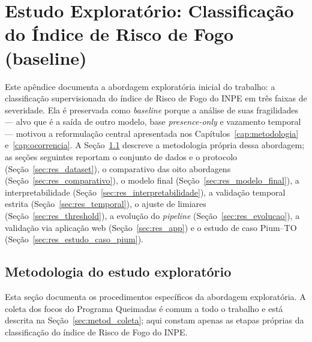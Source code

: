\chapter{Estudo Exploratório: Classificação do Índice de Risco de Fogo (baseline)}
\label{cap:resultados}

Este apêndice documenta a abordagem exploratória inicial do trabalho: a classificação supervisionada do índice de Risco de Fogo do INPE em três faixas de severidade. Ela é preservada como \emph{baseline} porque a análise de suas fragilidades --- alvo que é a saída de outro modelo, base \emph{presence-only} e vazamento temporal --- motivou a reformulação central apresentada nos Capítulos~\ref{cap:metodologia} e~\ref{cap:ocorrencia}. A Seção~\ref{sec:ap_metodologia} descreve a metodologia própria dessa abordagem; as seções seguintes reportam o conjunto de dados e o protocolo (Seção~\ref{sec:res_dataset}), o comparativo das oito abordagens (Seção~\ref{sec:res_comparativo}), o modelo final (Seção~\ref{sec:res_modelo_final}), a interpretabilidade (Seção~\ref{sec:res_interpretabilidade}), a validação temporal estrita (Seção~\ref{sec:res_temporal}), o ajuste de limiares (Seção~\ref{sec:res_threshold}), a evolução do \emph{pipeline} (Seção~\ref{sec:res_evolucao}), a validação via aplicação web (Seção~\ref{sec:res_app}) e o estudo de caso Pium--TO (Seção~\ref{sec:res_estudo_caso_pium}).

\section{Metodologia do estudo exploratório}
\label{sec:ap_metodologia}

Esta seção documenta os procedimentos específicos da abordagem exploratória. A coleta dos focos do Programa Queimadas é comum a todo o trabalho e está descrita na Seção~\ref{sec:metod_coleta}; aqui constam apenas as etapas próprias da classificação do índice de Risco de Fogo do INPE.

